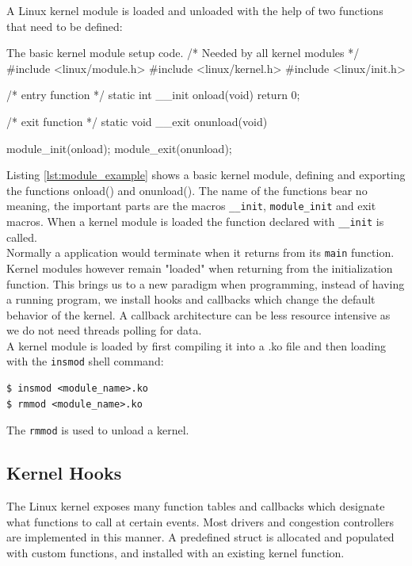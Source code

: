 \documentclass[a4paper,english, 11pt]{report}
\begin{document}
A Linux kernel module is loaded and unloaded with the help of two functions that need to be defined:\\

\begin{autonumlstlisting}[label=lst:module_example]{The basic kernel module setup code.}
/* Needed by all kernel modules */
#include <linux/module.h> 
#include <linux/kernel.h>
#include <linux/init.h>

/* entry function */
static int __init onload(void) {
    return 0;
}

/* exit function */
static void __exit onunload(void) {
    
}

module_init(onload);
module_exit(onunload);
\end{autonumlstlisting}

Listing \ref{lst:module_example} shows a basic kernel module, defining and exporting the functions onload() and onunload(). The name of the functions bear no meaning, the important parts are the macros \verb|__init|, \verb|module_init| and exit macros\cite{lkm}. When a kernel module is loaded the function declared with \verb|__init| is called.\\

Normally a application would terminate when it returns from its \verb|main| function. Kernel modules however remain "loaded" when returning from the initialization function. This brings us to a new paradigm when programming, instead of having a running program, we install hooks and callbacks which change the default behavior of the kernel. A callback architecture can be less resource intensive as we do not need threads polling for data.\\

A kernel module is loaded by first compiling it into a .ko file and then loading with the \verb|insmod| shell command:
\begin{verbatim}
$ insmod <module_name>.ko
$ rmmod <module_name>.ko
\end{verbatim}
The \verb|rmmod| is used to unload a kernel. 

\subsection{Kernel Hooks}
The Linux kernel exposes many function tables and callbacks which designate what functions to call at certain events. Most drivers and congestion controllers are implemented in this manner. A predefined struct is allocated and populated with custom functions, and installed with an existing kernel function.
\end{document}
